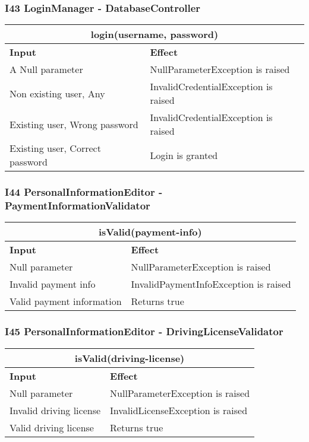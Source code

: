 \subsubsection{I43 LoginManager - DatabaseController}
\begin{tabular}{|p{5cm}|p{7cm}|}
\hline
\multicolumn{2}{|c|}{login(username, password)} \\
\hline
\textbf{Input} & \textbf{Effect} \\

\hline
A Null parameter & NullParameterException is raised \\

\hline
Non existing user, Any & InvalidCredentialException is raised \\

\hline
Existing user, Wrong password & InvalidCredentialException is raised \\

\hline
Existing user, Correct password & Login is granted \\
\hline
\end{tabular}


\subsubsection{I44 PersonalInformationEditor - PaymentInformationValidator}
\begin{tabular}{|p{5cm}|p{7cm}|}
\hline
\multicolumn{2}{|c|}{isValid(payment-info)} \\
\hline
\textbf{Input} & \textbf{Effect} \\

\hline
Null parameter & NullParameterException is raised \\

\hline
Invalid payment info & InvalidPaymentInfoException is raised \\

\hline
Valid payment information & Returns true \\
\hline
\end{tabular}

\subsubsection{I45 PersonalInformationEditor - DrivingLicenseValidator}
\begin{tabular}{|p{5cm}|p{7cm}|}
\hline
\multicolumn{2}{|c|}{isValid(driving-license)} \\
\hline
\textbf{Input} & \textbf{Effect} \\

\hline
Null parameter & NullParameterException is raised \\

\hline
Invalid driving license & InvalidLicenseException is raised \\

\hline
Valid driving license & Returns true \\
\hline
\end{tabular}

